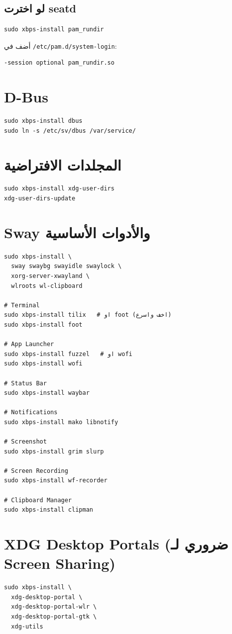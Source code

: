 \documentclass[12pt, a4paper]{report}
\newcommand{\file}[1]{\texttt{\color{warn}#1}}
\begin{document}
\subsection{لو اخترت seatd}
\begin{lstlisting}
sudo xbps-install pam_rundir
\end{lstlisting}
أضف في \file{/etc/pam.d/system-login}:
\begin{lstlisting}[style=inistyle]
-session optional pam_rundir.so
\end{lstlisting}

\section{D-Bus}
\begin{lstlisting}
sudo xbps-install dbus
sudo ln -s /etc/sv/dbus /var/service/
\end{lstlisting}

\section{المجلدات الافتراضية}
\begin{lstlisting}
sudo xbps-install xdg-user-dirs
xdg-user-dirs-update
\end{lstlisting}

\section{Sway والأدوات الأساسية}
\begin{lstlisting}
sudo xbps-install \
  sway swaybg swayidle swaylock \
  xorg-server-xwayland \
  wlroots wl-clipboard

# Terminal
sudo xbps-install tilix   # او foot (اخف واسرع)
sudo xbps-install foot

# App Launcher
sudo xbps-install fuzzel   # او wofi
sudo xbps-install wofi

# Status Bar
sudo xbps-install waybar

# Notifications
sudo xbps-install mako libnotify

# Screenshot
sudo xbps-install grim slurp

# Screen Recording
sudo xbps-install wf-recorder

# Clipboard Manager
sudo xbps-install clipman
\end{lstlisting}

\section{XDG Desktop Portals (ضروري لـ Screen Sharing)}
\begin{lstlisting}
sudo xbps-install \
  xdg-desktop-portal \
  xdg-desktop-portal-wlr \
  xdg-desktop-portal-gtk \
  xdg-utils
\end{lstlisting}
\end{document}
